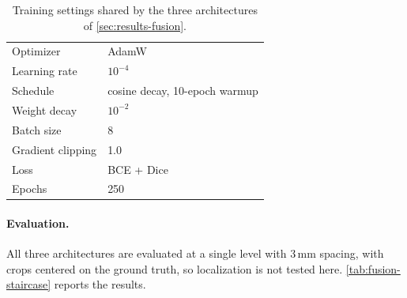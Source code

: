 \documentclass[hidelinks, a4paper, 12pt, ngerman, english]{article}  %
\begin{document}
\begin{table}[t]
  \centering
  \small
  \caption{Training settings shared by the three architectures of
  \autoref{sec:results-fusion}.}
  \label{tab:fusion-trainsettings}
  \begin{tabular}{@{}ll@{}}
    \toprule
    Optimizer & AdamW \\
    Learning rate & $10^{-4}$ \\
    Schedule & cosine decay, 10-epoch warmup \\
    Weight decay & $10^{-2}$ \\
    Batch size & 8 \\
    Gradient clipping & 1.0 \\
    Loss & BCE + Dice \\
    Epochs & 250 \\
    \bottomrule
  \end{tabular}
\end{table}

\paragraph{Evaluation.}
All three architectures are evaluated at a single level with 3\,mm spacing,
with crops centered on the ground truth, so localization is not tested here.
\autoref{tab:fusion-staircase} reports the results.
\end{document}
